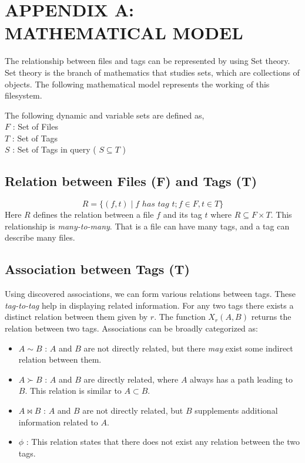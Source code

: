\begingroup
\let\clearpage\relax
\chapter*{APPENDIX A: MATHEMATICAL MODEL}
\endgroup
The relationship between files and tags can be represented by using Set theory. Set theory is the branch of mathematics that studies sets, which are collections of objects. The following mathematical model represents the working of this filesystem. 

\noindent The following dynamic and variable sets are defined as, \\
\indent $F$	: Set of Files \\
\indent $T$	: Set of Tags \\
\indent $S$	: Set of Tags in query ( $S \subseteq T$ ) \\

\section{Relation between Files (F) and Tags (T)}
$$ R = \{(f,t) \mid f \,\, has \,\, tag \,\,t; f \in F, t \in T\}$$
Here $R$ defines the relation between a file $f$ and its tag $t$ where $R \subseteq F \times T$. This relationship is \emph{many-to-many}. 
That is a file can have many tags, and a tag can describe many files.

\section{Association between Tags (T)}
Using discovered associations, we can form various relations between tags. These \emph{tag-to-tag} help in displaying related information. For any two tags there exists a distinct relation between them given by $r$. The function $X_{r}(A,B)$ returns the relation between two tags. Associations can be broadly categorized as:
\begin{itemize}
\item {$A \sim B$} : $A$ and $B$ are not directly related, but there \emph{may} exist some indirect relation between them.
\item $A \succ B$ : $A$ and $B$ are directly related, where $A$ always has a path leading to $B$. This relation is similar to $A \subset B$.
\item $A \bowtie B$ : $A$ and $B$ are not directly related, but $B$ supplements additional information related to $A$.
\item $\phi$ : This relation states that there does not exist any relation between the two tags.
\end{itemize}

